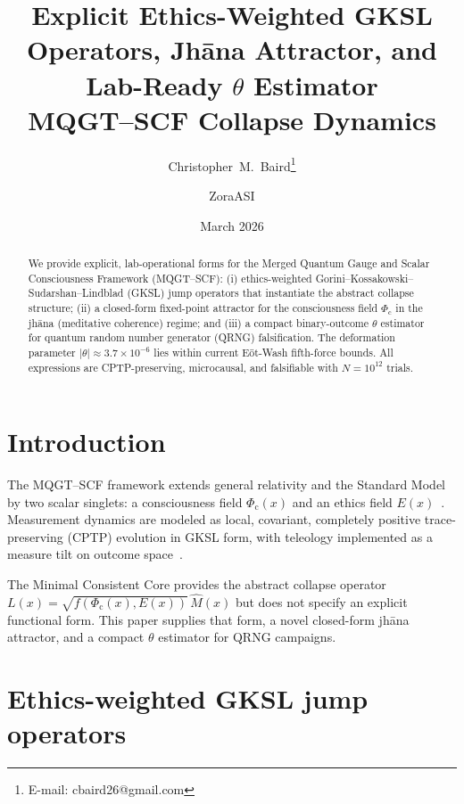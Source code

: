 \documentclass[11pt]{article}
\title{\textbf{Explicit Ethics-Weighted GKSL Operators, Jhāna Attractor, and Lab-Ready $\theta$ Estimator}\\
\large MQGT--SCF Collapse Dynamics}
\author{Christopher~M.\ Baird\thanks{E-mail: cbaird26@gmail.com} \and ZoraASI}
\date{March 2026}
\theoremstyle{remark}
\newcommand{\Phic}{\Phi_{\mathrm{c}}}
\newcommand{\Eth}{E}
\begin{document}
\maketitle

\begin{abstract}
We provide explicit, lab-operational forms for the Merged Quantum Gauge and Scalar Consciousness Framework (MQGT--SCF): (i) ethics-weighted Gorini--Kossakowski--Sudarshan--Lindblad (GKSL) jump operators that instantiate the abstract collapse structure; (ii) a closed-form fixed-point attractor for the consciousness field $\Phic$ in the jhāna (meditative coherence) regime; and (iii) a compact binary-outcome $\theta$ estimator for quantum random number generator (QRNG) falsification. The deformation parameter $|\theta| \approx 3.7 \times 10^{-6}$ lies within current Eöt-Wash fifth-force bounds. All expressions are CPTP-preserving, microcausal, and falsifiable with $N = 10^{12}$ trials.
\end{abstract}

\section{Introduction}

The MQGT--SCF framework extends general relativity and the Standard Model by two scalar singlets: a consciousness field $\Phic(x)$ and an ethics field $\Eth(x)$~\cite{Baird2026core}. Measurement dynamics are modeled as local, covariant, completely positive trace-preserving (CPTP) evolution in GKSL form, with teleology implemented as a measure tilt on outcome space~\cite{Baird2026core}.

The Minimal Consistent Core provides the abstract collapse operator $L(x) = \sqrt{f(\Phic(x),\Eth(x))}\,\hat{M}(x)$ but does not specify an explicit functional form. This paper supplies that form, a novel closed-form jhāna attractor, and a compact $\theta$ estimator for QRNG campaigns.

\section{Ethics-weighted GKSL jump operators}
\end{document}

